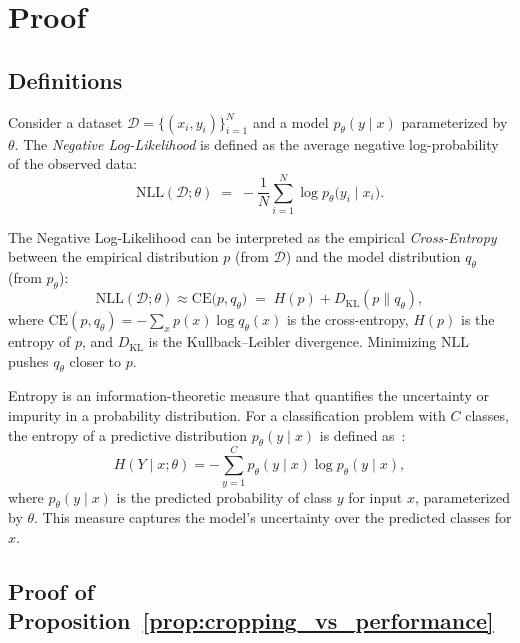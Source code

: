 \section{Proof}

\subsection{Definitions}


\begin{definition}
\label{def:nll}
Consider a dataset 
\(\mathcal{D} = \{(x_i,y_i)\}_{i=1}^N\) and a model \(p_\theta(y \mid x)\) 
parameterized by \(\theta\). The \emph{Negative Log-Likelihood} is defined as 
the average negative log-probability of the observed data:
\[
\mathrm{NLL}(\mathcal{D}; \theta)
\;=\;
-\frac{1}{N}\sum_{i=1}^N \log p_\theta\bigl(y_i \mid x_i\bigr).
\]
\end{definition}


\begin{remark}
The Negative Log-Likelihood can be interpreted as the empirical \emph{Cross-Entropy} between the empirical distribution \( p \) (from \( \mathcal{D} \)) and the model distribution \( q_\theta \) (from \( p_\theta \)):
\[
\mathrm{NLL}(\mathcal{D}; \theta) \approx \mathrm{CE}\bigl(p, q_\theta\bigr)
\;=\;
H(p) + D_\mathrm{KL}(p\|q_\theta),
\]
where \( \mathrm{CE}(p, q_\theta) = -\sum_x p(x) \log q_\theta(x) \) is the cross-entropy, \( H(p) \) is the entropy of \( p \), and \( D_\mathrm{KL} \) is the Kullback--Leibler divergence. Minimizing \( \mathrm{NLL} \) pushes \( q_\theta \) closer to \( p \).
\end{remark}


\begin{definition}
Entropy is an information-theoretic measure that quantifies the uncertainty or impurity in a probability distribution. For a classification problem with \( C \) classes, the entropy of a predictive distribution \( p_\theta(y \mid x) \) is defined as~\cite{settles2009active}:
\[
H(Y \mid x; \theta) 
= 
-\sum_{y=1}^C p_\theta(y \mid x) \log p_\theta(y \mid x),
\]
where \( p_\theta(y \mid x) \) is the predicted probability of class \( y \) for input \( x \), parameterized by \(\theta\). This measure captures the model's uncertainty over the predicted classes for \( x \).
\end{definition}

\subsection{Proof of Proposition~\ref{prop:cropping_vs_performance}}
\label{proof:prop}

